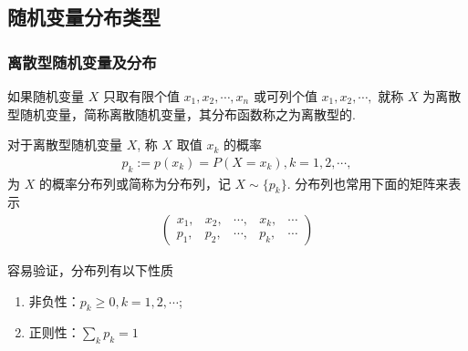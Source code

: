 \documentclass[Prob-All.tex]{subfiles}
\begin{document}
\subsection{随机变量分布类型}
\begin{frame}
	\frametitle{离散型随机变量及分布}
	\begin{defi}[离散型随机变量] 如果随机变量 $X$ 只取有限个值 $x_1,x_2,\cdots, x_n$ 或可列个值 $x_1,x_2,\cdots,$ 就称 $X$ 为离散型随机变量，简称离散随机变量，其分布函数称之为离散型的.
	\end{defi}
	\pause
	\begin{defi}[离散型随机变量的分布列或概率质量函数] 对于离散型随机变量 $X$, 称 $X$ 取值 $x_k$ 的概率
		\begin{eqnarray*}
			p_k:=p(x_k)=P(X=x_k), k=1,2,\cdots,
		\end{eqnarray*}
		为 $X$ 的概率分布列或简称为分布列，记 $X\sim \{p_k\}$. 分布列也常用下面的矩阵来表示
		\begin{eqnarray*}
			\left(\begin{array}{ccccc}
				x_1, & x_2, & \cdots, & x_k, & \cdots  \\
				p_1, & p_2, & \cdots, & p_k, & \cdots
			\end{array}\right)
		\end{eqnarray*}
	\end{defi}
	\pause
	容易验证，分布列有以下性质
	\begin{enumerate}[<+-|alert@+>]
		\item 非负性：$p_k\ge 0, k=1,2,\cdots$;
		\item 正则性：$\sum_{k} p_k=1$
	\end{enumerate}


\end{frame}
\end{document}
